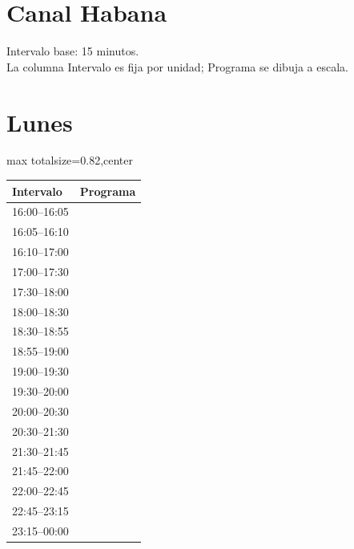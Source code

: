 \documentclass[11pt,a4paper]{article}
\begin{document}
\section*{Canal Habana}
Intervalo base: 15 minutos.\\
La columna Intervalo es fija por unidad; Programa se dibuja a escala.\\

\section*{Lunes}
\begin{center}
\begin{adjustbox}{max totalsize={\textwidth}{0.82\textheight},center}
\begin{tabular}{|p{3.6cm}|p{11cm}|}
\hline
\textbf{Intervalo} & \textbf{Programa} \\
\hline
{\centering\rule{0pt}{0.93ex}16:00--16:05} & {\centering\rule{0pt}{0.93ex}} \\
{\centering\rule{0pt}{0.93ex}16:05--16:10} & {\centering\rule{0pt}{0.93ex}} \\
{\centering\rule{0pt}{9.33ex}16:10--17:00} & {\centering\rule{0pt}{9.33ex}} \\
{\centering\rule{0pt}{5.60ex}17:00--17:30} & {\centering\rule{0pt}{5.60ex}} \\
{\centering\rule{0pt}{5.60ex}17:30--18:00} & {\centering\rule{0pt}{5.60ex}} \\
{\centering\rule{0pt}{5.60ex}18:00--18:30} & {\centering\rule{0pt}{5.60ex}} \\
{\centering\rule{0pt}{4.67ex}18:30--18:55} & {\centering\rule{0pt}{4.67ex}} \\
{\centering\rule{0pt}{0.93ex}18:55--19:00} & {\centering\rule{0pt}{0.93ex}} \\
{\centering\rule{0pt}{5.60ex}19:00--19:30} & {\centering\rule{0pt}{5.60ex}} \\
{\centering\rule{0pt}{5.60ex}19:30--20:00} & {\centering\rule{0pt}{5.60ex}} \\
{\centering\rule{0pt}{5.60ex}20:00--20:30} & {\centering\rule{0pt}{5.60ex}} \\
{\centering\rule{0pt}{11.20ex}20:30--21:30} & {\centering\rule{0pt}{11.20ex}} \\
{\centering\rule{0pt}{2.80ex}21:30--21:45} & {\centering\rule{0pt}{2.80ex}} \\
{\centering\rule{0pt}{2.80ex}21:45--22:00} & {\centering\rule{0pt}{2.80ex}} \\
{\centering\rule{0pt}{8.40ex}22:00--22:45} & {\centering\rule{0pt}{8.40ex}} \\
{\centering\rule{0pt}{5.60ex}22:45--23:15} & {\centering\rule{0pt}{5.60ex}} \\
{\centering\rule{0pt}{8.40ex}23:15--00:00} & {\centering\rule{0pt}{8.40ex}} \\
\hline
\end{tabular}
\end{adjustbox}
\end{center}
\end{document}
